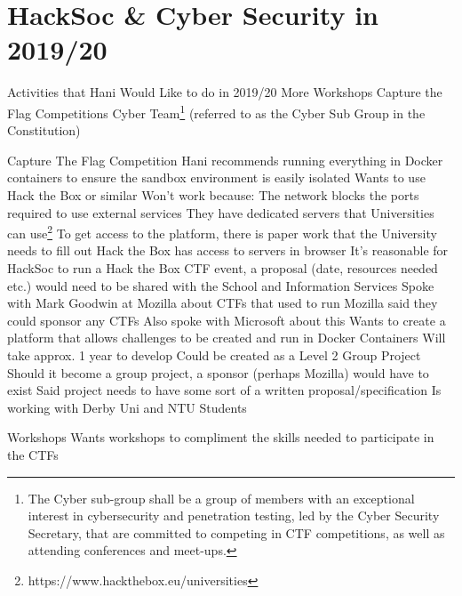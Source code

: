 \documentclass[11pt,hacksoc]{meetingmins}
\begin{document}
\maketitle

\section{HackSoc \& Cyber Security in 2019/20}
\begin{items}
	\item Activities that Hani Would Like to do in 2019/20
		\subitem More Workshops
		\subitem Capture the Flag Competitions
		\subitem Cyber Team\footnote{The Cyber sub-group shall be a group of members with an exceptional interest in cybersecurity and penetration testing, led by the Cyber Security Secretary, that are committed to competing in CTF competitions, as well as attending conferences and meet-ups.} (referred to as the Cyber Sub Group in the Constitution)
		
	\item Capture The Flag Competition
		\subitem Hani recommends running everything in Docker containers to ensure the sandbox environment is easily isolated
		\subitem Wants to use Hack the Box or similar
			\subsubitem Won't work because: The network blocks the ports required to use external services
			\subsubitem They have dedicated servers that Universities can use\footnote{https://www.hackthebox.eu/universities}
			\subsubitem To get access to the platform, there is paper work that the University needs to fill out
			\subsubitem Hack the Box has access to servers in browser
			\subsubitem It's reasonable for HackSoc to run a Hack the Box CTF event, a proposal (date, resources needed etc.) would need to be shared with the School and Information Services
		\subitem Spoke with Mark Goodwin at Mozilla about CTFs that used to run
			\subsubitem Mozilla said they could sponsor any CTFs
			\subsubitem Also spoke with Microsoft about this
		\subitem Wants to create a platform that allows challenges to be created and run in Docker Containers
			\subsubitem Will take approx. 1 year to develop
			\subsubitem Could be created as a Level 2 Group Project 
			\subsubitem Should it become a group project, a sponsor (perhaps Mozilla) would have to exist
			\subsubitem Said project needs to have some sort of a written proposal/specification
			\subsubitem Is working with Derby Uni and NTU Students
			
	\item Workshops
		\subitem Wants workshops to compliment the skills needed to participate in the CTFs
		

\end{items}
\end{document}
